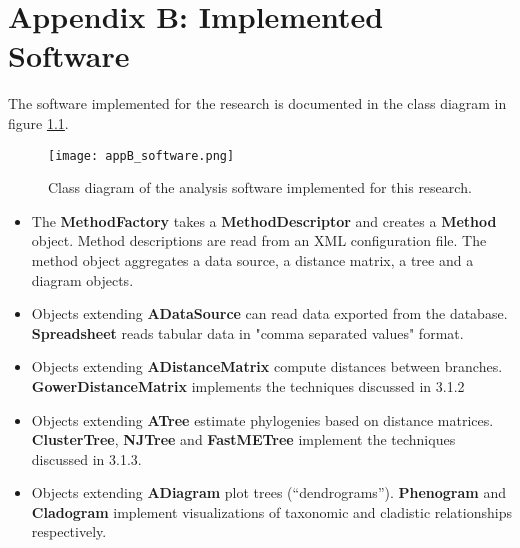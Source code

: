 
\chapter{Appendix B: Implemented Software} %

\label{AppendixB} %

The software implemented for the research is documented in the class diagram in figure \ref{fig:appB_software}.

\begin{figure}[H]
  \centering
  \texttt{[image: appB\_software.png]}
  \caption{Class diagram of the analysis software implemented for this research.}
  \label{fig:appB_software}
\end{figure}

\begin{itemize}
  \item{The \textbf{MethodFactory} takes a \textbf{MethodDescriptor} and creates a \textbf{Method} object. Method
descriptions are read from an XML configuration file. The method object aggregates a data
source, a distance matrix, a tree and a diagram objects.}
  \item{Objects extending \textbf{ADataSource} can read data exported from the database. \textbf{Spreadsheet} reads tabular data in "comma separated values" format.}
  \item{Objects extending \textbf{ADistanceMatrix} compute distances between branches.
\textbf{GowerDistanceMatrix} implements the techniques discussed in 3.1.2}
  \item{Objects extending \textbf{ATree} estimate phylogenies based on distance matrices. \textbf{ClusterTree}, \textbf{NJTree} and \textbf{FastMETree} implement the techniques discussed in 3.1.3.}
  \item{Objects extending \textbf{ADiagram} plot trees (“dendrograms”). \textbf{Phenogram} and \textbf{Cladogram} implement visualizations of taxonomic and cladistic relationships respectively.}
\end{itemize}
